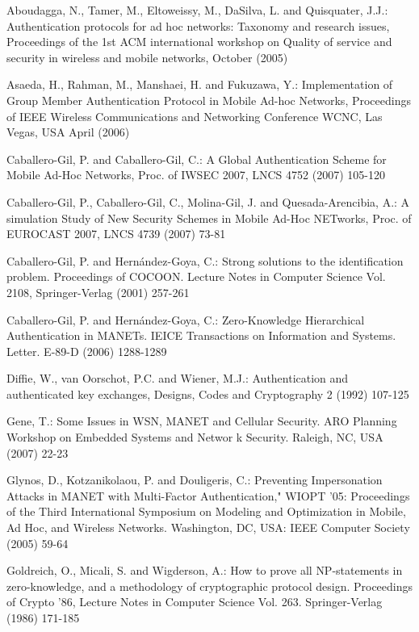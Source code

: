 \documentclass{article}
\begin{document}
\begin{thebibliography}{10}

Aboudagga, N., Tamer, M., Eltoweissy, M.,  DaSilva, L. and  Quisquater, J.J.:
Authentication protocols for ad hoc networks: Taxonomy and
research issues, Proceedings of the 1st ACM international workshop
on Quality of service and security in wireless and mobile
networks, October (2005)

Asaeda, H.,  Rahman, M., Manshaei, H. and Fukuzawa, Y.:
Implementation of Group Member Authentication Protocol in Mobile
Ad-hoc Networks, Proceedings of IEEE Wireless Communications and
Networking Conference WCNC, Las Vegas, USA April (2006)

 Caballero-Gil, P. and Caballero-Gil, C.: A Global Authentication Scheme for Mobile Ad-Hoc Networks, Proc. of IWSEC 2007, LNCS 4752 (2007) 105-120

 Caballero-Gil, P.,  Caballero-Gil, C.,   Molina-Gil, J.  and Quesada-Arencibia, A.: A simulation Study of New Security Schemes in Mobile Ad-Hoc NETworks, Proc. of EUROCAST 2007, LNCS 4739 (2007) 73-81

Caballero-Gil, P. and Hern{\'a}ndez-Goya, C.: Strong solutions to the
identification problem. Proceedings of COCOON. Lecture Notes in
Computer
  Science Vol. 2108, Springer-Verlag (2001) 257-261
  
  
 Caballero-Gil, P. and Hern\'andez-Goya, C.: Zero-Knowledge Hierarchical Authentication in MANETs.
IEICE Transactions on Information and Systems. Letter. E-89-D
(2006) 1288-1289

Diffie, W., van Oorschot, P.C. and Wiener, M.J.: Authentication and authenticated key exchanges, Designs, Codes and Cryptography 2 (1992) 107-125

 Gene, T.: Some Issues in WSN, MANET and Cellular Security. ARO Planning Workshop on Embedded Systems and Networ k Security. Raleigh, NC, USA (2007) 22-23

 Glynos, D., Kotzanikolaou, P. and Douligeris, C.: Preventing Impersonation
Attacks in MANET with Multi-Factor Authentication," WIOPT '05: Proceedings of the Third International Symposium on Modeling and Optimization in Mobile, Ad Hoc, and Wireless Networks. Washington, DC, USA: IEEE Computer Society (2005) 59-64

Goldreich, O., Micali, S. and Wigderson, A.: How to prove all
{NP}-statements in zero-knowledge, and a methodology
  of cryptographic protocol design.
Proceedings of Crypto '86, Lecture Notes in Computer Science Vol.
263.
  Springer-Verlag (1986)  171-185


\end{thebibliography}
\end{document}
